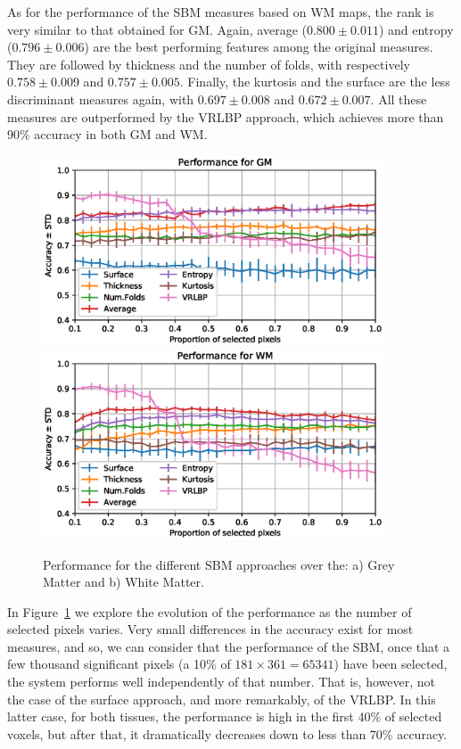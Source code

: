 As for the performance of the \ac{SBM} measures based on \ac{WM} maps, the rank is very similar to that obtained for \ac{GM}. Again, average ($0.800 \pm 0.011$) and entropy ($0.796 \pm 0.006$) are the best performing features among the original measures. They are followed by thickness and the number of folds, with respectively $0.758 \pm 0.009$ and $0.757 \pm 0.005$. Finally, the kurtosis and the surface are the less discriminant measures again, with $0.697 \pm 0.008$ and $0.672 \pm 0.007$. All these measures are outperformed by the \ac{VRLBP} approach, which achieves more than 90\% accuracy in both \ac{GM} and \ac{WM}. 

\begin{figure}[htp]
	\centering
	\includegraphics[width=0.9\textwidth]{Graphics/ch6/GMperformanceComp}\\
	\includegraphics[width=0.9\textwidth]{Graphics/ch6/WMperformanceComp}
	\caption{Performance for the different \ac{SBM} approaches over the: a) Grey Matter and b) White Matter.}
	\label{fig:figureGM}
\end{figure}

In Figure~\ref{fig:figureGM} we explore the evolution of the performance as the number of selected pixels varies. Very small differences in the accuracy exist for most measures, and so, we can consider that the performance of the \ac{SBM}, once that a few thousand significant pixels (a 10\% of $181\times361=65341$) have been selected, the system performs well independently of that number. That is, however, not the case of the surface approach, and more remarkably, of the \ac{VRLBP}. In this latter case, for both tissues, the performance is high in the first 40\% of selected voxels, but after that, it dramatically decreases down to less than 70\% accuracy. 

